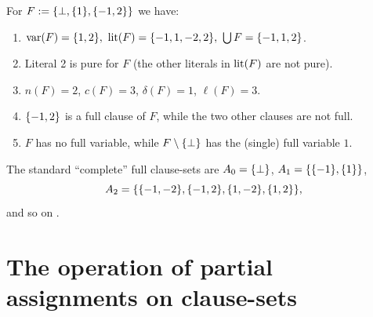 \documentclass[12pt]{book}
\begin{document}
\begin{examp}\label{exp:measurecls}
  For $F := \{ \bot, \{ 1 \},\{ -1,2 \} \}$ we have:
  \begin{enumerate}
  \item $\operatorname{var}(F) = \{1, 2\},\ \operatorname{lit}(F) = \{- 1, 1,- 2, 2\},\ \bigcup F = \{-1, 1, 2\}$.
  \item Literal 2 is pure for $F$ (the other literals in $\operatorname{lit}(F)$ are not pure).
  \item $n(F) = 2$, $c(F) = 3$, $\delta(F) = 1$, $\ell(F) = 3$.
  \item $\{ -1,2 \}$ is a full clause of $F$, while the two other clauses are not full.
  \item $F$ has no full variable, while $F \setminus \{ \bot \}$ has the (single) full variable $1$.
  \end{enumerate}
  The standard ``complete'' full clause-sets are $A_0 = \{ \bot \}$, $A_1 = \{ \{ -1 \},\{ 1 \} \}$,
  \begin{displaymath}
    A_2 = \{ \{ -1,-2 \},\{ -1,2 \},\{ 1,-2 \},\{ 1,2 \} \},
  \end{displaymath}
  and so on \cite{h12}.
\end{examp}
\section{The operation of partial assignments on clause-sets}
\label{sec:oppasscls}
\end{document}
